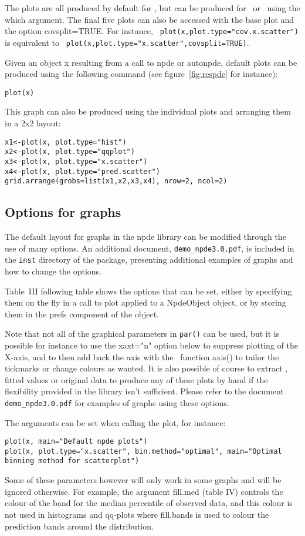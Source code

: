 The plots are all produced by default for \npd, but can be produced for \npde~or \pd~using the {\sf which} argument. The final five plots can also be accessed with the base plot and the option {\sf covsplit=TRUE}. For instance, \verb+ plot(x,plot.type="cov.x.scatter")+ is equivalent to \verb+ plot(x,plot.type="x.scatter",covsplit=TRUE)+.

Given an object {\sf x} resulting from a call to {\sf npde} or {\sf autonpde}, default plots can be produced using the following command (see figure~\ref{fig:respde} for instance):
\begin{verbatim}
plot(x)
\end{verbatim}
This graph can also be produced using the individual plots and arranging them in a 2x2 layout:
\begin{verbatim}
x1<-plot(x, plot.type="hist")
x2<-plot(x, plot.type="qqplot")
x3<-plot(x, plot.type="x.scatter")
x4<-plot(x, plot.type="pred.scatter")
grid.arrange(grobs=list(x1,x2,x3,x4), nrow=2, ncol=2)
\end{verbatim}

\subsection{Options for graphs}

\hskip 18pt The default layout for graphs in the {\sf npde} library can be modified through the use of many options. An additional document, \verb+demo_npde3.0.pdf+, is included in the \texttt{inst} directory of the package, presenting additional examples of graphs and how to change the options.

Table~III following table shows the options that can be set, either by specifying them on the fly in a call to plot applied to a NpdeObject object, or by storing them in the {\sf prefs} component of the object.

Note that not all of the graphical parameters in \texttt{par()} can be used, but it is possible for instance to use the {\sf xaxt="n"} option below to suppress plotting of the X-axis, and to then add back the axis with the \R~function {\sf axis()} to tailor the tickmarks or change colours as wanted. It is also possible of course to extract \npde, fitted values or original data to produce any of these plots by hand if the flexibility provided in the library isn't sufficient. Please refer to the document \verb+demo_npde3.0.pdf+ for examples of graphs using these options.

The arguments can be set when calling the plot, for instance:
\begin{verbatim}
plot(x, main="Default npde plots")
plot(x, plot.type="x.scatter", bin.method="optimal", main="Optimal binning method for scatterplot")
\end{verbatim}
Some of these parameters however will only work in some graphs and will be ignored otherwise. For example, the argument {\sf fill.med} (table IV) controls the colour of the band for the median percentile of observed data, and this colour is not used in histograms and qq-plots where fill.bands is used to colour the prediction bands around the distribution.

